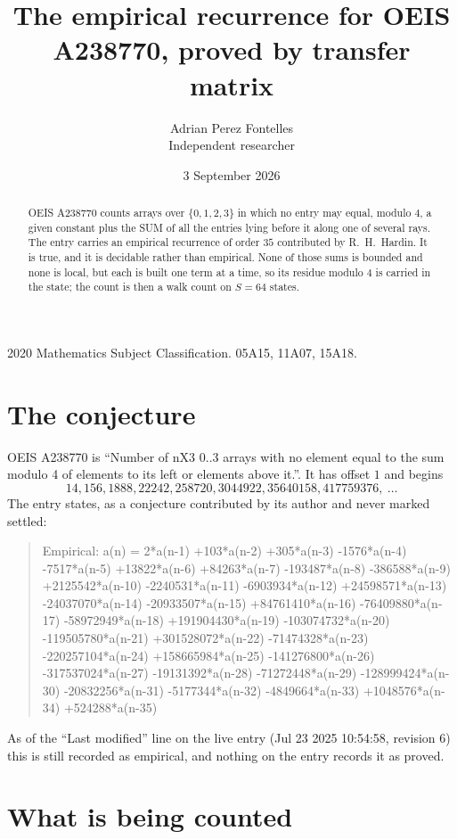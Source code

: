 \documentclass[11pt,a4paper]{article}
\title{The empirical recurrence for OEIS A238770, proved by transfer matrix}
\author{Adrian Perez Fontelles\\ \small Independent researcher}
\date{3 September 2026}
\theoremstyle{plain}
\theoremstyle{definition}
\begin{document}
\maketitle

\begin{abstract}
OEIS A238770 counts arrays over $\{0,1,2,3\}$ in which no entry may equal, modulo $4$, a given
constant plus the SUM of all the entries lying before it along one of several rays. The entry
carries an empirical recurrence of order $35$ contributed by R.~H.~Hardin. It is true, and
it is decidable rather than empirical. None of those sums is bounded and none is local, but
each is built one term at a time, so its residue modulo $4$ is carried in the state; the
count is then a walk count on $S=64$ states.
\end{abstract}

\noindent\small 2020 Mathematics Subject Classification. 05A15, 11A07, 15A18.\normalsize

\section{The conjecture}

OEIS A238770 is ``Number of nX3 0..3 arrays with no element equal to the sum modulo 4 of elements to its left or elements above it.''. It has offset $1$ and begins
\[
14, 156, 1888, 22242, 258720, 3044922, 35640158, 417759376,\ \dots
\]
The entry states, as a conjecture contributed by its author and never marked settled:
\begin{quote}
Empirical: a(n) = 2*a(n-1) +103*a(n-2) +305*a(n-3) -1576*a(n-4) -7517*a(n-5) +13822*a(n-6) +84263*a(n-7) -193487*a(n-8) -386588*a(n-9) +2125542*a(n-10) -2240531*a(n-11) -6903934*a(n-12) +24598571*a(n-13) -24037070*a(n-14) -20933507*a(n-15) +84761410*a(n-16) -76409880*a(n-17) -58972949*a(n-18) +191904430*a(n-19) -103074732*a(n-20) -119505780*a(n-21) +301528072*a(n-22) -71474328*a(n-23) -220257104*a(n-24) +158665984*a(n-25) -141276800*a(n-26) -317537024*a(n-27) -19131392*a(n-28) -71272448*a(n-29) -128999424*a(n-30) -20832256*a(n-31) -5177344*a(n-32) -4849664*a(n-33) +1048576*a(n-34) +524288*a(n-35)
\end{quote}
As of the ``Last modified'' line on the live entry (Jul 23 2025 10:54:58, revision 6) this is still
recorded as empirical, and nothing on the entry records it as proved.

\section{What is being counted}
\end{document}
